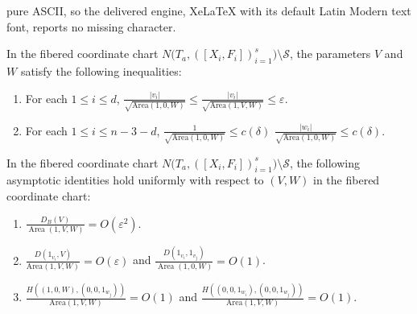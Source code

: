 \documentclass[10pt,a4paper]{amsart}
\begin{document}
pure ASCII, so the delivered engine, XeLaTeX with its default Latin Modern text font, reports no missing character.
\begin{lemma}\label{lem:basicinequalityforVW}
In the fibered coordinate chart $N\big(T_a, ([X_i, F_i])_{i=1}^s\big) \setminus \mathcal{S}$, the parameters $V$ and $W$ satisfy the following inequalities:
    \begin{enumerate}
        \item For each $1 \leq i \leq d$,
        $
        \frac{|v_i|}{\sqrt{\mathrm{Area}(1,0,W)}} \leq\frac{|v_i|}{\sqrt{\mathrm{Area}(1,V,W)}}\leq \varepsilon.
        $
        
        \item For each $1 \leq i \leq n-3-d$,
        $
       \frac{1}{\sqrt{\mathrm{Area}(1,0,W)}} \leq c(\delta)$  $\frac{|w_i|}{\sqrt{\mathrm{Area}(1,0,W)}} \leq c(\delta).
        $
    \end{enumerate}
\end{lemma}

\begin{lemma}\label{lem:someidentitiesofuniformapproximation}
In the fibered coordinate chart $N\big(T_a, ([X_i, F_i])_{i=1}^s\big) \setminus \mathcal{S}$, the following asymptotic identities hold uniformly with respect to $(V,W)$ in the fibered coordinate chart:
\begin{enumerate}
    \item $\frac{D_B(V)}{\operatorname{Area}(1,V,W)}=O(\varepsilon^2)$.
    \item $\frac{D(1_{v_i}, V)}{\mathrm{Area}(1,V,W)} = O(\varepsilon)$ and $\frac{D(1_{v_i},1_{v_j})}{\operatorname{Area}(1,0,W)}=O(1)$.
    \item $\frac{H((1,0,W),(0,0,1_{w_j}))}{\mathrm{Area}(1,V,W)} = O(1)$ and $\frac{H((0,0,1_{w_i}),(0,0,1_{w_j}))}{\mathrm{Area}(1,V,W)} = O(1)$.
\end{enumerate}
\end{lemma}
\end{document}
